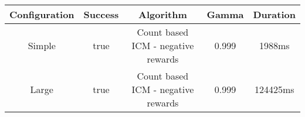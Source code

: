 \begin{tabular}{|c|c|c|c|c|}
\hline
Configuration & Success & Algorithm & Gamma & Duration\\
\hline
Simple & true & Count based ICM - negative rewards & 0.999 & 1988ms\\
Large & true & Count based ICM - negative rewards & 0.999 & 124425ms\\
\hline
\end{tabular}